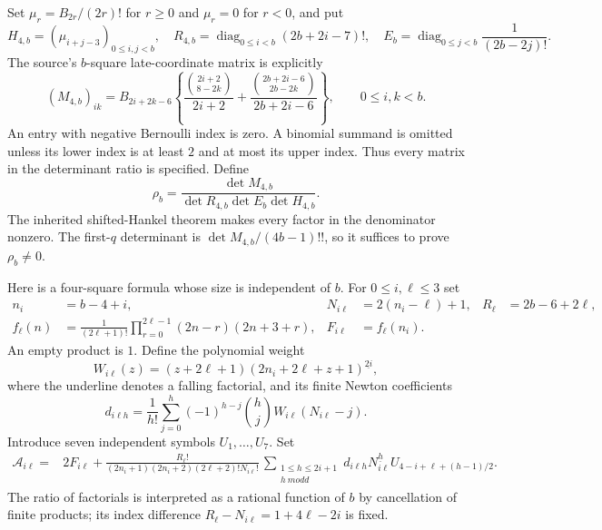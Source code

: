 Set $\mu_r=B_{2r}/(2r)!$ for $r\ge0$ and $\mu_r=0$ for $r<0$,
and put
\[
 H_{4,b}=(\mu_{i+j-3})_{0\le i,j<b},\quad
 R_{4,b}=\operatorname{diag}_{0\le i<b}(2b+2i-7)!,\quad
 E_b=\operatorname{diag}_{0\le j<b}\frac1{(2b-2j)!}.
\]
The source's $b$-square late-coordinate matrix is explicitly
\begin{equation}\label{rank8:source-matrix}
 (M_{4,b})_{ik}=B_{2i+2k-6}
 \left\{\frac{\binom{2i+2}{8-2k}}{2i+2}
       +\frac{\binom{2b+2i-6}{2b-2k}}{2b+2i-6}\right\},
 \qquad 0\le i,k<b.
\end{equation}
An entry with negative Bernoulli index is zero. A binomial summand is
omitted unless its lower index is at least $2$ and at most its upper
index. Thus every matrix in the determinant ratio is specified. Define
\begin{equation}\label{rank8:rho}
 \rho_b=\frac{\det M_{4,b}}
 {\det R_{4,b}\det E_b\det H_{4,b}}.
\end{equation}
The inherited shifted-Hankel theorem makes every factor in the
denominator nonzero.  The first-$q$ determinant is
$\det M_{4,b}/(4b-1)!!$, so it suffices to prove $\rho_b\ne0$.

Here is a four-square formula whose size is independent of $b$.
For $0\le i,\ell\le3$ set
\begin{align*}
 n_i&=b-4+i,&N_{i\ell}&=2(n_i-\ell)+1,&R_\ell&=2b-6+2\ell,\\
 f_\ell(n)&=\frac1{(2\ell+1)!}
       \prod_{r=0}^{2\ell-1}(2n-r)(2n+3+r),&F_{i\ell}&=f_\ell(n_i).
\end{align*}
An empty product is $1$.  Define the polynomial weight
\[
 W_{i\ell}(z)=(z+2\ell+1)
                 (2n_i+2\ell+z+1)^{\underline{2i}},
\]
where the underline denotes a falling factorial, and its finite
Newton coefficients
\begin{equation}\label{rank8:newton}
 d_{i\ell h}=\frac1{h!}\sum_{j=0}^{h}
       (-1)^{h-j}\binom hj W_{i\ell}(N_{i\ell}-j).
\end{equation}
Introduce seven independent symbols $U_1,\ldots,U_7$.  Set
\begin{equation}\label{rank8:A}
 \begin{split}
 \mathcal A_{i\ell}={}&2F_{i\ell}+
 \frac{R_\ell!}
 {(2n_i+1)(2n_i+2)(2\ell+2)!N_{i\ell}!}\,
 \sum_{\substack{1\le h\le2i+1\\h\ {
m odd}}}
 d_{i\ell h}N_{i\ell}^{\underline h}
 U_{4-i+\ell+(h-1)/2}.
 \end{split}
\end{equation}
The ratio of factorials is interpreted as a rational function of $b$
by cancellation of finite products; its index difference
$R_\ell-N_{i\ell}=1+4\ell-2i$ is fixed.

